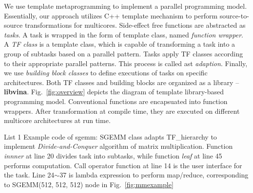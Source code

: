 We use template metaprogramming to implement a parallel programming model.
Essentially, our approach utilizes C++ template mechanism to
perform source-to-source transformations for multicores. Side-effect
free functions are abstracted as \emph{tasks}. A task is
wrapped in the form of template class, named \emph{function
  wrapper}.  A \emph{TF class} is a template class, which
is capable of transforming a task into a group of subtasks based on
a parallel pattern. Tasks
apply TF classes according to their appropriate
parallel patterns. This process is called ast \emph{adaption}. 
Finally, we use \emph{building block classes} to define executions of tasks
on specific architectures. Both TF classes and building
blocks are organized as a library --
\textbf{libvina}. Fig.~\ref{fig:overview} depicts the diagram of template
library-based programming model. Conventional functions are
encapsuated into function wrappers. After transformation at compile time, they are
executed on different multicore architectures at run time.

\renewcommand\linenumberfont{\normalfont\small}
\setlength\linenumbersep{-0.06in}





\makebox[3.4in]{\hrulefill}

List 1 Example code of sgemm: SGEMM class adapts TF\_hierarchy
to implement \emph{Divide-and-Conquer} algorithm of matrix
multiplication. Function \textit{innner} at
line 20 divides task into subtasks, while function \textit{leaf} at
line 45 performs
computation. Call operator function at line 14 is the user interface for the task.
Line 24$\sim$37 is lambda expression to perform map/reduce, corresponding to
SGEMM(512, 512, 512) node in Fig.~\ref{fig:mmexample}\\

\makebox[3.4in]{\hrulefill}

